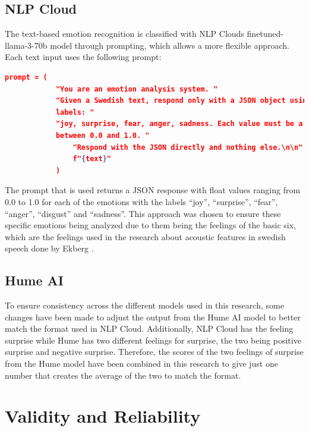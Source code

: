 \subsection{NLP Cloud}
\label{sec:method-nlp}
The text-based emotion recognition is classified with NLP Clouds finetuned-llama-3-70b model
through prompting, which allows a more flexible approach.
Each text input uses the following prompt:
\begin{center}
    \begin{minipage}{0.7\textwidth} 
    \begin{lstlisting}[language=json, caption={NLP Cloud configuration prompt.}]
        prompt = (
            "You are an emotion analysis system. "
            "Given a Swedish text, respond only with a JSON object using these emotion
            labels: "
            "joy, surprise, fear, anger, sadness. Each value must be a float
            between 0.0 and 1.0. "
                "Respond with the JSON directly and nothing else.\n\n"
                f"{text}"
            )
    \end{lstlisting}
    \end{minipage}
\end{center} 
The prompt that is used returns a JSON response with float values ranging from 0.0 to 1.0 for each of
the emotions with the labels “joy”, “surprise”, “fear”, “anger”, “disgust” and “sadness”. This approach
was chosen to ensure these specific emotions being analyzed due to them being the feelings of the basic
six, which are the feelings used in the research about acoustic features in swedish speech done by
Ekberg \autocite{Ekberg2023}. 

\subsection{Hume AI}
To ensure consistency across the different models used in this research, some changes have been
made to adjust the output from the Hume AI model to better match the format used in NLP Cloud.
Additionally, NLP Cloud has the feeling surprise while Hume has two different feelings for surprise,
the two being positive surprise and negative surprise. Therefore, the scores of the two feelings of
surprise from the Hume model have been combined in this research to give just one number that
creates the average of the two to match the format.

\section{Validity and Reliability}
